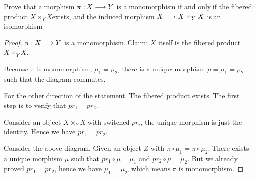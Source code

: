 \begin{exr}
Prove that a morphism $\pi: X\longrightarrow Y$ is a monomorphism if and only if the fibered product $X \times_Y X $exists, and the induced morphism $X \longrightarrow  X \times_Y X$ is an isomorphism.
\end{exr}
\begin{proof}
$\pi:X\longrightarrow Y$ is a monomorphism. \underline{Claim}: $X$ itself is the fibered product $X\times_Y X$.
\begin{center}
\end{center}
Because $\pi$ is monomorphism, $\mu_1=\mu_2$, there is a unique morphism $\mu=\mu_1=\mu_2$ such that the diagram commutes.

For the other direction of the statement. The fibered product exists. The first step is to verify that $pr_1=pr_2$.
\begin{center}
\end{center}
Consider an object $X\times_Y X$ with switched $pr_i$, the unique morphism is just the identity. Hence we have $pr_1=pr_2$.

\begin{center}
\end{center}
Consider the above diagram. Given an object $Z$ with $\pi\circ\mu_1=\pi\circ \mu_2$. There exists a unique morphism $\mu$ such that $pr_1\circ\mu=\mu_1$ and $pr_2\circ \mu=\mu_2$. But we already proved $pr_1=pr_2$, hence we have $\mu_1=\mu_2$, which means $\pi$ is monomorphism.
\end{proof}


